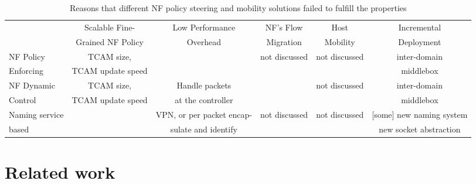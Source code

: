 


\begin{table*}[ht]\label{compare} 
\centering
\small 

\begin{tabular} {l |c | c| c| c| c }


                            			     &Scalable Fine-              &   Low Performance    &  NF's  Flow      &  Host        &  Incremental \\
						     &Grained NF Policy    	  &   Overhead           & Migration       &  Mobility   & Deployment \\\hline
						     
NF Policy                                           & TCAM size,      	          &                      & not discussed      &   not discussed  & inter-domain  \\
Enforcing~\cite{SIMPLE,FLOWTAGS}                   & TCAM update speed          &                      &                   &               &  middlebox \\ \hline


NF Dynamic                                          &TCAM size,     	          &  Handle packets      &                &  not discussed    & inter-domain\\ 
Control~\cite{OpenNF,splitmerge}                       &  TCAM update speed         & at the controller     &                &                & middlebox  \\   \hline


Naming service                          &			  	 & VPN, or per packet encap-                   & not discussed       & not discussed &  [some] new naming system  \\ 
based~\cite{DOA, Aplomb}                         &                              & sulate and identify          &                    &                  & new socket abstraction     \\\hline 



\end{tabular}
\caption{\small Reasons that different NF policy steering and mobility solutions failed to fulfill the properties}
\end{table*}





\section{Related work}

